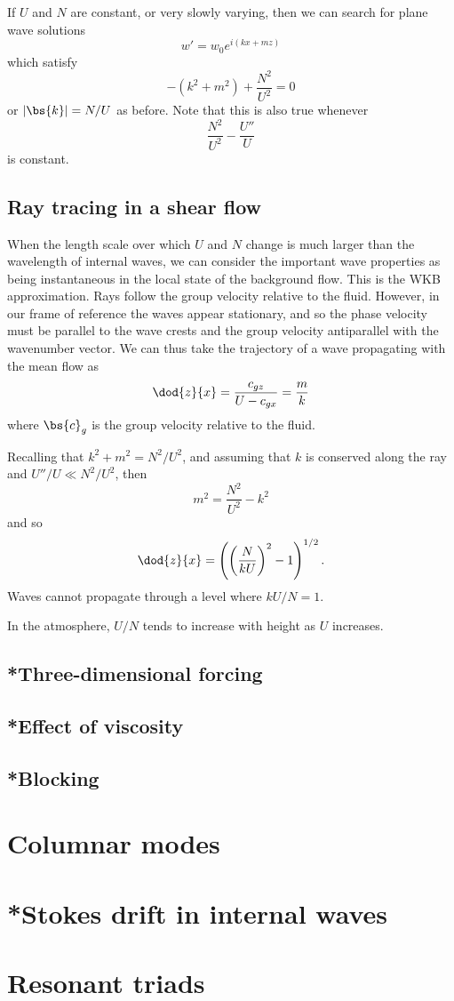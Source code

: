 If $U$ and $N$ are constant, or very slowly varying, then we can search for plane wave solutions
\begin{equation}
	w' = w_0 e^{i(kx+mz)}
\end{equation}
which satisfy
\begin{equation}
	-(k^2 + m^2) + \frac{N^2}{U^2} = 0
\end{equation}
or $|\bs{k}| = N/U$ as before. Note that this is also true whenever
\begin{equation}
	\frac{N^2}{U^2} - \frac{U''}{U} 
\end{equation}
is constant.

\subsection{Ray tracing in a shear flow}

When the length scale over which $U$ and $N$ change is much larger than the
wavelength of internal waves, we can consider the important wave properties as
being instantaneous in the local state of the background flow. This is the WKB
approximation. Rays follow the group velocity relative to the fluid. However, in
our frame of reference the waves appear stationary, and so the phase velocity
must be parallel to the wave crests and the group velocity antiparallel with the
wavenumber vector. We can thus take the trajectory of a wave propagating with
the mean flow as
\begin{equation}
	\dod{z}{x} = \frac{c_{gz}}{U - c_{gx}} = \frac{m}{k}
\end{equation}
where $\bs{c}_g$ is the group velocity relative to the fluid.

Recalling that $k^2 + m^2 = N^2 / U^2$, and assuming that $k$ is conserved along the ray and $U''/U \ll N^2 /U^2$, then
\begin{equation}
	m^2 = \frac{N^2}{U^2} - k^2
\end{equation}
and so 
\begin{equation}
	\dod{z}{x} = \left(\left(\frac{N}{kU}\right)^2 - 1\right)^{1/2}.
\end{equation}
Waves cannot propagate through a level where $kU/N = 1$.

In the atmosphere, $U/N$ tends to increase with height as $U$ increases.

\subsection{*Three-dimensional forcing}
\subsection{*Effect of viscosity}
\subsection{*Blocking}

\section{Columnar modes}
\section{*Stokes drift in internal waves}
\section{Resonant triads}
